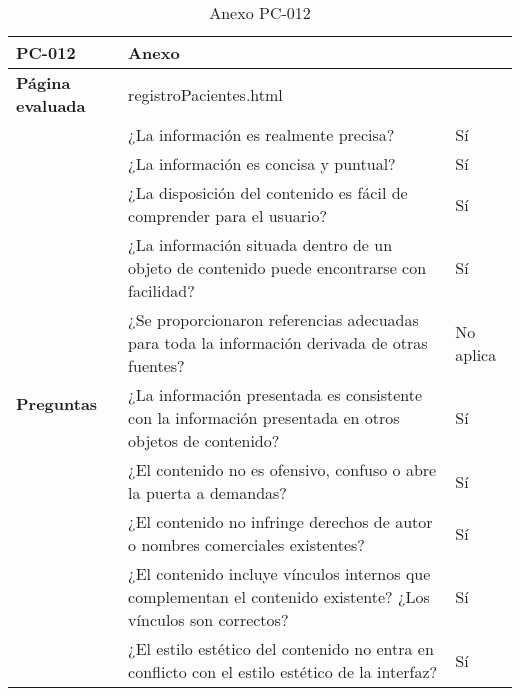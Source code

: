 \begin{table}[htpb]
\centering
\begin{tabularx}{\textwidth}{|l|X|l|}
\hline
\textbf{PC-012}                       & \multicolumn{2}{l|}{Anexo}                                                                                                \\ \hline
\textbf{Página evaluada}             & \multicolumn{2}{l|}{registroPacientes.html}                                                                               \\ \hline
\multirow{10}{*}{\textbf{Preguntas}} & ¿La información es realmente precisa?                                                                         & Sí        \\ \cline{2-3} 
                                     & ¿La información es concisa y puntual?                                                                         & Sí        \\ \cline{2-3} 
                                     & ¿La disposición del contenido es fácil de comprender para el usuario?                                         & Sí        \\ \cline{2-3} 
                                     & ¿La información situada dentro de un objeto de contenido puede encontrarse con facilidad?                     & Sí        \\ \cline{2-3} 
                                     & ¿Se proporcionaron referencias adecuadas para toda la información derivada de otras fuentes?                  & No aplica \\ \cline{2-3} 
                                     & ¿La información presentada es consistente con la información presentada en otros objetos de contenido?        & Sí        \\ \cline{2-3} 
                                     & ¿El contenido no es ofensivo, confuso o abre la puerta a demandas?                                            & Sí        \\ \cline{2-3} 
                                     & ¿El contenido no infringe derechos de autor o nombres comerciales existentes?                                 & Sí        \\ \cline{2-3} 
                                     & ¿El contenido incluye vínculos internos que complementan el contenido existente? ¿Los vínculos son correctos? & Sí        \\ \cline{2-3} 
                                     & ¿El estilo estético del contenido no entra en conflicto con el estilo estético de la interfaz?                & Sí        \\ \hline
\end{tabularx}
\caption{Anexo PC-012}
\end{table}


